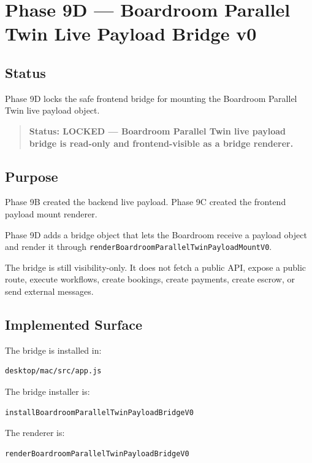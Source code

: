 \section{Phase 9D --- Boardroom Parallel Twin Live Payload Bridge v0}
\label{sec:aion-boardroom-parallel-twin-payload-bridge-v0}

\subsection{Status}

Phase 9D locks the safe frontend bridge for mounting the Boardroom Parallel Twin live payload object.

\begin{quote}
\textbf{Status: LOCKED --- Boardroom Parallel Twin live payload bridge is read-only and frontend-visible as a bridge renderer.}
\end{quote}

\subsection{Purpose}

Phase 9B created the backend live payload. Phase 9C created the frontend payload mount renderer.

Phase 9D adds a bridge object that lets the Boardroom receive a payload object and render it through \texttt{renderBoardroomParallelTwinPayloadMountV0}.

The bridge is still visibility-only. It does not fetch a public API, expose a public route, execute workflows, create bookings, create payments, create escrow, or send external messages.

\subsection{Implemented Surface}

The bridge is installed in:

\begin{verbatim}
desktop/mac/src/app.js
\end{verbatim}

The bridge installer is:

\begin{verbatim}
installBoardroomParallelTwinPayloadBridgeV0
\end{verbatim}

The renderer is:

\begin{verbatim}
renderBoardroomParallelTwinPayloadBridgeV0
\end{verbatim}

